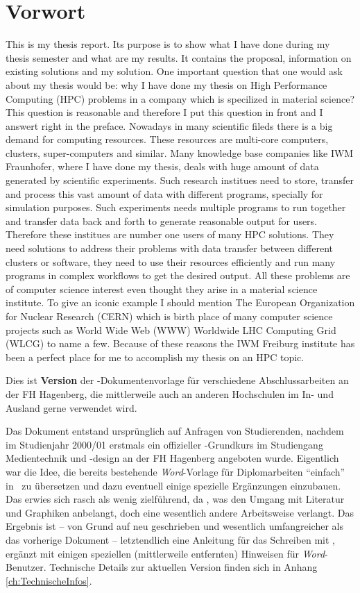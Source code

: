 \chapter{Vorwort} 	%

This is my thesis report. Its purpose is to show what I have done during my thesis semester and what are my results. It contains the proposal,
information on existing solutions and my solution. One important question that one
would ask about my thesis would be: why I have done my thesis on High Performance
Computing (HPC) problems in a company which is specilized in material science?
This question is reasonable and therefore I put this question in front and I 
answert right in the preface. 
Nowadays in many scientific fileds there is a big demand for computing resources.
These resources are multi-core computers, clusters, super-computers and similar. 
Many knowledge base companies like IWM Fraunhofer, where I have done my thesis, 
deals with huge amount of data generated by scientific experiments. Such research 
institues need to store, transfer and process this vast amount of data with different
programs, specially for simulation purposes. Such experiments needs multiple programs
to run together and transfer data back and forth to generate reasonable output for
users. Therefore these institues are number one users of many HPC solutions. They
need solutions to address their problems with data transfer between different clusters
or software, they need to use their resources efficiently and run many programs in
complex workflows to get the desired output. All these problems are of computer
science interest even thought they arise in a material science institute.
To give an iconic example I should mention The European Organization for Nuclear
Research (CERN) which is birth place of many computer science projects such as
World Wide Web (WWW) Worldwide LHC Computing Grid (WLCG)\cite{WLCG} to name a few.
Because of these reasons the IWM Freiburg institute has been a perfect place for me
to accomplish my thesis on an HPC topic.


Dies ist \textbf{Version \hgbthesisDate} der \latex-Dokumentenvorlage für 
verschiedene Abschlussarbeiten an der FH Hagenberg, die mittlerweile auch 
an anderen Hochschulen im In- und Ausland gerne verwendet wird.

Das Dokument entstand ursprünglich auf Anfragen von Studierenden,
nachdem im Studienjahr 2000/01 erstmals ein offizieller
\latex-Grundkurs im Studiengang Medientechnik und -design an der
FH Hagenberg angeboten wurde. Eigentlich war die Idee, die bereits
bestehende \emph{Word}-Vorlage für Diplomarbeiten "`einfach"' in
\latex\ zu übersetzen und dazu eventuell einige spezielle
Ergänzungen einzubauen. Das erwies sich rasch als wenig
zielführend, da \latex, \va was den Umgang mit Literatur und
Graphiken anbelangt, doch eine wesentlich andere Arbeitsweise
verlangt. Das Ergebnis ist -- von Grund auf neu geschrieben und
wesentlich umfangreicher als das vorherige Dokument --
letztendlich eine Anleitung für das Schreiben mit \latex, ergänzt
mit einigen speziellen (mittlerweile entfernten) Hinweisen für \emph{Word}-Benutzer.
Technische Details zur aktuellen Version finden sich in Anhang \ref{ch:TechnischeInfos}.

